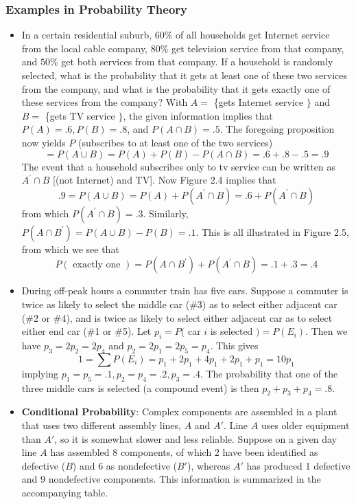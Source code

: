 \documentclass{report}
\begin{document}
    \subsubsection{Examples in Probability Theory}
    \bigbreak \noindent 
    \begin{itemize}
        \item In a certain residential suburb, $60 \%$ of all households get Internet service from the local cable company, $80 \%$ get television service from that company, and $50 \%$ get both services from that company. If a household is randomly selected, what is the probability that it gets at least one of these two services from the company, and what is the probability that it gets exactly one of these services from the company?
            With $A=$ \{gets Internet service $\}$ and $B=$ \{gets TV service $\}$, the given information implies that $P(A)=.6, P(B)=.8$, and $P(A \cap B)=.5$. The foregoing proposition now yields
            $P$ (subscribes to at least one of the two services)
            $$
            =P(A \cup B)=P(A)+P(B)-P(A \cap B)=.6+.8-.5=.9
            $$
            The event that a household subscribes only to tv service can be written as $A^{\prime} \cap B$ [(not Internet) and TV]. Now Figure 2.4 implies that
            $$
            .9=P(A \cup B)=P(A)+P\left(A^{\prime} \cap B\right)=.6+P\left(A^{\prime} \cap B\right)
            $$
            from which $P\left(A^{\prime} \cap B\right)=.3$. Similarly, $P\left(A \cap B^{\prime}\right)=P(A \cup B)-P(B)=.1$. This is all illustrated in Figure 2.5, from which we see that
            $$
            P(\text { exactly one })=P\left(A \cap B^{\prime}\right)+P\left(A^{\prime} \cap B\right)=.1+.3=.4
            $$
        \item During off-peak hours a commuter train has five cars. Suppose a commuter is twice as likely to select the middle car (\#3) as to select either adjacent car (\#2 or \#4), and is twice as likely to select either adjacent car as to select either end car (\#1 or \#5). Let $p_i=P($ car $i$ is selected $)=P\left(E_i\right)$. Then we have $p_3=2 p_2=2 p_4$ and $p_2=2 p_1=2 p_5=p_4$. This gives
            $$
            1=\sum P\left(E_i\right)=p_1+2 p_1+4 p_1+2 p_1+p_1=10 p_1
            $$
            implying $p_1=p_5=.1, p_2=p_4=.2, p_3=.4$. The probability that one of the three middle cars is selected (a compound event) is then $p_2+p_3+p_4=.8$.
        \item \textbf{Conditional Probability}:
            Complex components are assembled in a plant that uses two different assembly lines, $A$ and $A'$. Line $A$ uses older equipment than $A'$, so it is somewhat slower and less reliable. Suppose on a given day line $A$ has assembled 8 components, of which 2 have been identified as defective ($B$) and 6 as nondefective ($B'$), whereas $A'$ has produced 1 defective and 9 nondefective components. This information is summarized in the accompanying table.


\end{itemize}
\end{document}
